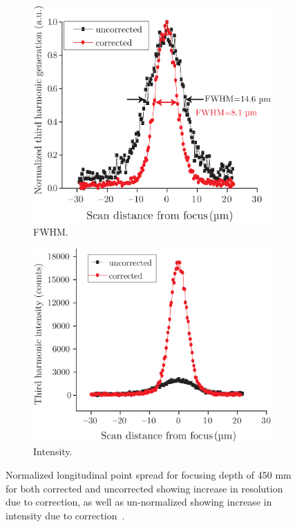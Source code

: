 \begin{figure}[tbh]
       \centering
        \begin{subfigure}[b]{0.45\textwidth}
                \includegraphics[width=\textwidth]{images/genetic_TPFM_FWHM}
                \caption{FWHM.}
                \label{fig:genetic_TPFM_FWHM}
        \end{subfigure}
				\hspace{1em}
        \begin{subfigure}[b]{0.45\textwidth}
                \includegraphics[width=\textwidth]{images/genetic_TPFM_intensity}
                \caption{Intensity.}
                \label{fig:genetic_TPFM_intensity}
        \end{subfigure}
        \caption{Normalized longitudinal point spread for focusing depth of 450 mm for both corrected and uncorrected showing increase in resolution due to correction, as well as un-normalized showing increase in intensity due to correction~\cite{Genetic_MPFM}.}
\label{fig:genetic_TPFM}
\end{figure} 

